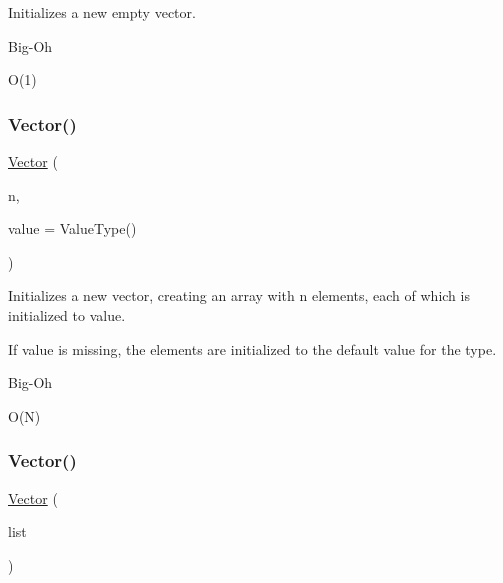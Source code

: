 Initializes a new empty vector. 

\begin{DoxyRefDesc}{Big-\/\+Oh}
\item[\mbox{\hyperlink{BigOh__BigOh000099}{Big-\/\+Oh}}]O(1) \end{DoxyRefDesc}
\mbox{\label{classVector_abf5f4a6c2e8f722dfaed5c07027a84ac}} 
\subsubsection{\texorpdfstring{Vector()}{Vector()}\hspace{0.1cm}{\footnotesize\ttfamily [2/3]}}
{\footnotesize\ttfamily \mbox{\hyperlink{classVector}{Vector}} (\begin{DoxyParamCaption}\item[{int}]{n,  }\item[{Value\+Type}]{value = {\ttfamily ValueType()} }\end{DoxyParamCaption})\hspace{0.3cm}{\ttfamily [explicit]}}



Initializes a new vector, creating an array with {\ttfamily n} elements, each of which is initialized to {\ttfamily value}. 

If {\ttfamily value} is missing, the elements are initialized to the default value for the type. \begin{DoxyRefDesc}{Big-\/\+Oh}
\item[\mbox{\hyperlink{BigOh__BigOh000100}{Big-\/\+Oh}}]O(\+N) \end{DoxyRefDesc}
\mbox{\label{classVector_a81ccc7dac38b6bdeca04281b1acb39c0}} 
\subsubsection{\texorpdfstring{Vector()}{Vector()}\hspace{0.1cm}{\footnotesize\ttfamily [3/3]}}
{\footnotesize\ttfamily \mbox{\hyperlink{classVector}{Vector}} (\begin{DoxyParamCaption}\item[{std\+::initializer\+\_\+list$<$ Value\+Type $>$}]{list }\end{DoxyParamCaption})}



